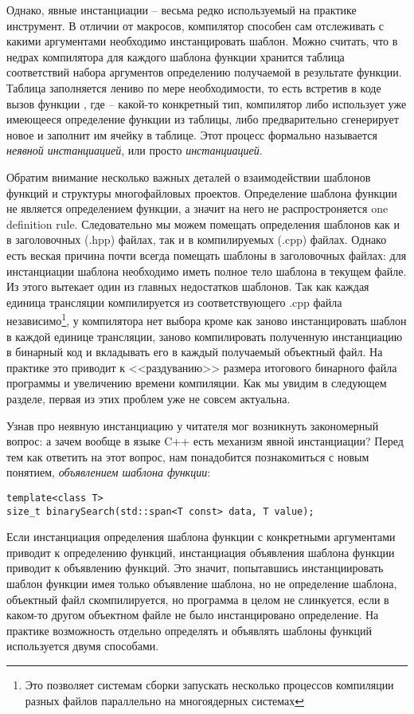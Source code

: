 Однако, явные инстанциации -- весьма редко используемый на практике инструмент. В отличии от макросов, компилятор способен сам отслеживать с какими аргументами необходимо инстанцировать шаблон. Можно считать, что в недрах компилятора для каждого шаблона функции хранится таблица соответствий набора аргументов определению получаемой в результате функции. Таблица заполняется лениво по мере необходимости, то есть встретив в коде вызов функции , где  -- какой-то конкретный тип, компилятор либо использует уже имеющееся определение функции из таблицы, либо предварительно сгенерирует новое и заполнит им ячейку в таблице. Этот процесс формально называется \textit{неявной инстанциацией}, или просто \textit{инстанциацией}.

Обратим внимание несколько важных деталей о взаимодействии шаблонов функций и структуры многофайловых проектов. Определение шаблона функции не является определением функции, а значит на него не распростроняется one definition rule. Следовательно мы можем помещать определения шаблонов как и в заголовочных (.hpp) файлах, так и в компилируемых (.cpp) файлах. Однако есть веская причина почти всегда помещать шаблоны в заголовочных файлах: для инстанциации шаблона необходимо иметь полное тело шаблона в текущем файле. Из этого вытекает один из главных недостатков шаблонов. Так как каждая единица трансляции компилируется из соответствующего .cpp файла независимо\footnote{Это позволяет системам сборки запускать несколько процессов компиляции разных файлов параллельно на многоядерных системах}, у компилятора нет выбора кроме как заново инстанцировать шаблон в каждой единице трансляции, заново компилировать полученную инстанциацию в бинарный код и вкладывать его в каждый получаемый объектный файл. На практике это приводит к <<раздуванию>> размера итогового бинарного файла программы и увеличению времени компиляции. Как мы увидим в следующем разделе, первая из этих проблем уже не совсем актуальна.

Узнав про неявную инстанциацию у читателя мог возникнуть закономерный вопрос: а зачем вообще в языке C++ есть механизм явной инстанциации? Перед тем как ответить на этот вопрос, нам понадобится познакомиться с новым понятием, \textit{объявлением шаблона функции}:
\begin{verbatim}
template<class T>
size_t binarySearch(std::span<T const> data, T value);
\end{verbatim}
Если инстанциация определения шаблона функции с конкретными аргументами приводит к определению функций, инстанциация объявления шаблона функции приводит к объявлению функций. Это значит, попытавшись инстанциировать шаблон функции имея только объявление шаблона, но не определение шаблона, объектный файл скомпилируется, но программа в целом не слинкуется, если в каком-то другом объектном файле не было инстанцировано определение. На практике возможность отдельно определять и объявлять шаблоны функций используется двумя способами. 


